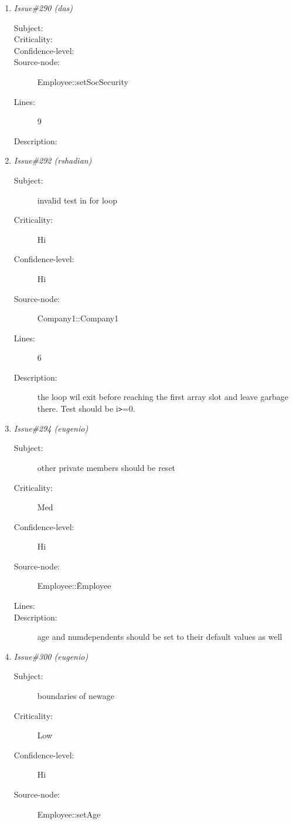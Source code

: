 \begin{enumerate}
\begin{description}
\item [Lines:] 6

\item [Description:] again, the boundaries go from 0 up till numemployees-1
\end{description}
\item {\it Issue\#290 (das)}
\begin{description}
\item [Subject:] 
\item [Criticality:] 
\item [Confidence-level:] 
\item [Source-node:] Employee::setSocSecurity

\item [Lines:] 9

\item [Description:] 
\end{description}
\item {\it Issue\#292 (rshadian)}
\begin{description}
\item [Subject:] invalid test in for loop
\item [Criticality:] Hi
\item [Confidence-level:] Hi
\item [Source-node:] Company1::Company1

\item [Lines:] 6

\item [Description:] the loop wil exit before reaching the first
array slot and leave garbage there.  Test should be i{\tt >}=0.
\end{description}
\item {\it Issue\#294 (eugenio)}
\begin{description}
\item [Subject:] other private members should be reset
\item [Criticality:] Med
\item [Confidence-level:] Hi
\item [Source-node:] Employee::\~Employee

\item [Lines:] 

\item [Description:] age and numdependents should be set to their
default values as well
\end{description}
\item {\it Issue\#300 (eugenio)}
\begin{description}
\item [Subject:] boundaries of newage
\item [Criticality:] Low
\item [Confidence-level:] Hi
\item [Source-node:] Employee::setAge


\end{description}
\end{enumerate}
